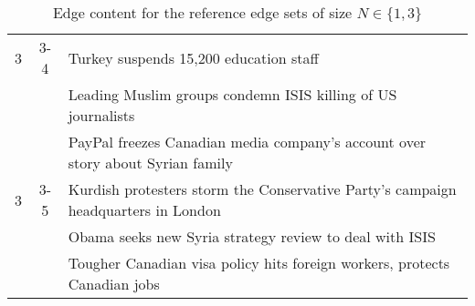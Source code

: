 \begin{table}[H]
\begin{tabular}{cc p{10cm}}
\hline
3 & 3-4 & Turkey suspends 15,200 education staff \\
 &  & Leading Muslim groups condemn ISIS killing of US journalists \\
 &  & PayPal freezes Canadian media company's account over story about Syrian family \\
\hline
3 & 3-5 & Kurdish protesters storm the Conservative Party's campaign headquarters in London \\
 &  & Obama seeks new Syria strategy review to deal with ISIS \\
 &  & Tougher Canadian visa policy hits foreign workers, protects Canadian jobs \\
\bottomrule
\end{tabular}
\caption{Edge content for the reference edge sets of size \(N \in \{1, 3\}\)}
\label{tab:ref-edge-sets-nref-1-3}
\end{table}


